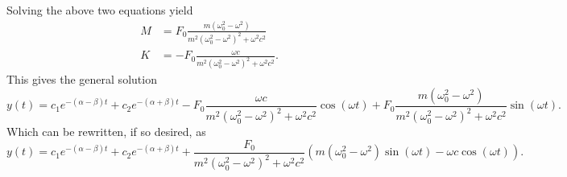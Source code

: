 Solving the above two equations yield
\begin{align*}
  M &= F_0 \frac{m \left( \omega_0^2 - \omega^2 \right)}{m^2 \left( \omega_0^2 - \omega^2 \right)^2 + \omega^2 c^2} \\
  K &= - F_0 \frac{\omega c}{m^2 \left( \omega_0^2 - \omega^2 \right)^2 + \omega^2 c^2}
.\end{align*}
This gives the general solution
\[ 
y(t) = c_1 e^{- \left( \alpha - \beta \right)t} + c_2e^{- \left( \alpha + \beta \right)t} - F_0 \frac{\omega c}{m^2 \left( \omega_0^2 - \omega^2 \right)^2 + \omega^2 c^2} \cos(\omega t) + F_0 \frac{m \left( \omega_0^2 - \omega^2 \right)}{m^2 \left( \omega_0^2 - \omega^2 \right)^2 + \omega^2 c^2} \sin(\omega t)
.\]
Which can be rewritten, if so desired, as
\[ 
y(t) = c_1 e^{- \left( \alpha - \beta \right)t} + c_2 e^{- \left( \alpha + \beta \right)t} + \frac{F_0}{m^2 \left( \omega_0^2 - \omega^2 \right)^2 + \omega^2 c^2} \left( m \left( \omega_0^2 - \omega^2 \right) \sin(\omega t) - \omega c \cos(\omega t) \right)
.\]



